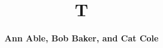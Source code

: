 \documentclass{revtex4-1}
\begin{document}
\title{T}
\author{\textbf{Ann Able, Bob Baker, and Cat Cole}}
\maketitle
\end{document}
